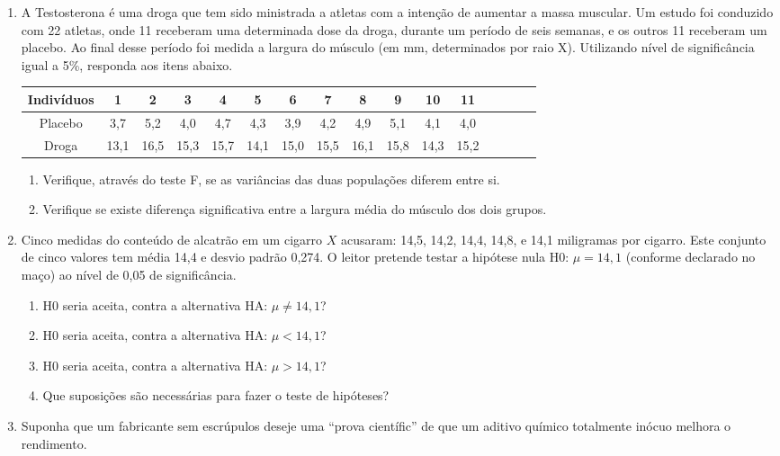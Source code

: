 \documentclass[10pt,brazil,addpoints]{exam}
\begin{document}
\begin{enumerate}[1.]
\medskip
\item A Testosterona é uma droga que tem sido ministrada a atletas com a intenção de aumentar a massa muscular. Um estudo foi conduzido com 22 atletas, onde 11 receberam uma determinada dose da droga, durante um período de seis semanas, e os outros 11 receberam um placebo. Ao final desse período foi medida a largura do músculo (em mm, determinados por raio X). Utilizando nível de significância igual a 5\%, responda aos itens abaixo.
\begin{center}
\begin{tabular}{c|ccccccccccccccc}
Indivíduos&1&2&3&4&5&6&7&8&9&10&11\\
\hline
Placebo &3,7&5,2&4,0&4,7&4,3&3,9&4,2&4,9&5,1&4,1&4,0\\
Droga &13,1&16,5&15,3&15,7&14,1&15,0&15,5&16,1&15,8&14,3&15,2\\
\end{tabular}
\end{center}


\begin{enumerate}[\bf (a)]
\item Verifique, através do teste F, se as variâncias das duas populações diferem entre si.
 \item Verifique se existe diferença significativa entre a largura média do músculo dos dois grupos.
\end{enumerate}


\medskip
\item
Cinco medidas do conteúdo de alcatrão em um cigarro $X$ acusaram: 14,5, 14,2, 14,4, 14,8, e 14,1 miligramas por cigarro. Este conjunto de cinco valores tem média 14,4 e desvio padrão 0,274. O leitor pretende testar a hipótese nula H0: $\mu = 14,1$ (conforme declarado no maço) ao nível de 0,05 de significância.

\begin{enumerate}[\bf (a)]
\item H0 seria aceita, contra a alternativa HA: $\mu \neq 14,1$?
\item H0 seria aceita, contra a alternativa HA: $\mu < 14,1$?
\item H0 seria aceita, contra a alternativa HA: $\mu > 14,1$?
\item Que suposições são necessárias para fazer o teste de hipóteses?
\end{enumerate}

\medskip
\item Suponha que um fabricante sem escrúpulos deseje uma ``prova científic'' de que um aditivo químico totalmente inócuo melhora o rendimento.


\end{enumerate}
\end{document}
